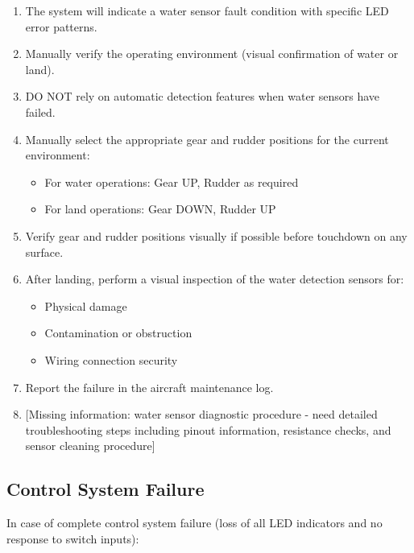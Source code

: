 \documentclass[12pt,a4paper,twoside,openright]{book}
\begin{document}
\begin{enumerate}
    \item The system will indicate a water sensor fault condition with specific LED error patterns.
    \item Manually verify the operating environment (visual confirmation of water or land).
    \item DO NOT rely on automatic detection features when water sensors have failed.
    \item Manually select the appropriate gear and rudder positions for the current environment:
    \begin{itemize}
        \item For water operations: Gear UP, Rudder as required
        \item For land operations: Gear DOWN, Rudder UP
    \end{itemize}
    \item Verify gear and rudder positions visually if possible before touchdown on any surface.
    \item After landing, perform a visual inspection of the water detection sensors for:
    \begin{itemize}
        \item Physical damage
        \item Contamination or obstruction
        \item Wiring connection security
    \end{itemize}
    \item Report the failure in the aircraft maintenance log.
    \item {\color{red}[Missing information: water sensor diagnostic procedure - need detailed troubleshooting steps including pinout information, resistance checks, and sensor cleaning procedure]}
\end{enumerate}

\subsection{Control System Failure}

In case of complete control system failure (loss of all LED indicators and no response to switch inputs):
\end{document}
